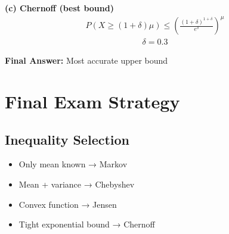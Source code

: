 \documentclass{article}
\begin{document}
\textbf{(c) Chernoff (best bound)}
\begin{align}
P(X \ge (1+\delta)\mu) \le \left( \frac{(1+\delta)^{1+\delta}}{e^\delta} \right)^\mu
\end{align}
\begin{align}
\delta = 0.3
\end{align}

\textbf{Final Answer:} Most accurate upper bound

\section{Final Exam Strategy}

\subsection{Inequality Selection}

\begin{itemize}
\item Only mean known → Markov
\item Mean + variance → Chebyshev
\item Convex function → Jensen
\item Tight exponential bound → Chernoff
\end{itemize}
\end{document}
